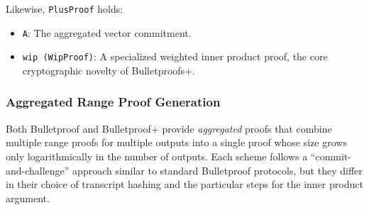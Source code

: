 Likewise, \texttt{PlusProof} holds:
\begin{itemize}
    \item \texttt{A}: The aggregated vector commitment.  
    \item \texttt{wip (WipProof)}: A specialized weighted inner product proof, the core cryptographic novelty of Bulletproofs+.  
\end{itemize}

\subsubsection{Aggregated Range Proof Generation}
Both Bulletproof and Bulletproof+ provide \emph{aggregated} proofs that combine multiple range proofs for multiple outputs into a single proof whose size grows only logarithmically in the number of outputs.  Each scheme follows a ``commit-and-challenge'' approach similar to standard Bulletproof protocols, but they differ in their choice of transcript hashing and the particular steps for the inner product argument.  

